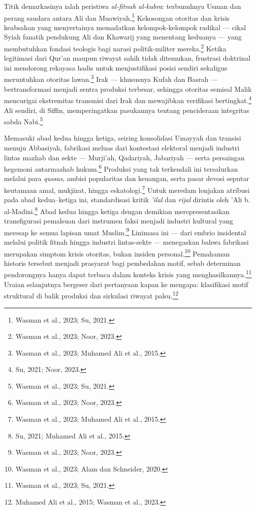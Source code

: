 Titik demarkasinya ialah peristiwa \textit{al-fitnah al-kubra}: terbunuhnya Usman dan perang saudara antara Ali dan Muawiyah.\footnote{Wasman et al., 2023; Su, 2021.} Kekosongan otoritas dan krisis keabsahan yang menyertainya memadatkan kelompok-kelompok radikal --- cikal Syiah fanatik pendukung Ali dan Khawarij yang menentang keduanya --- yang membutuhkan fondasi teologis bagi narasi politik-militer mereka.\footnote{Wasman et al., 2023; Noor, 2023.} Ketika legitimasi dari Qur'an maupun riwayat sahih tidak ditemukan, frustrasi doktrinal ini mendorong rekayasa hadis untuk menjustifikasi posisi sendiri sekaligus meruntuhkan otoritas lawan.\footnote{Wasman et al., 2023; Muhamed Ali et al., 2015.} Irak --- khususnya Kufah dan Basrah --- bertransformasi menjadi sentra produksi terbesar, sehingga otoritas semisal Malik mencurigai ekstremitas transmisi dari Irak dan mewajibkan verifikasi bertingkat.\footnote{Su, 2021; Noor, 2023.} Ali sendiri, di Siffin, memperingatkan pasukannya tentang pencideraan integritas sabda Nabi.\footnote{Wasman et al., 2023; Su, 2021.}

Memasuki abad kedua hingga ketiga, seiring konsolidasi Umayyah dan transisi menuju Abbasiyah, fabrikasi meluas dari kontestasi elektoral menjadi industri lintas mazhab dan sekte --- Murji'ah, Qadariyah, Jabariyah --- serta persaingan hegemoni antarmazhab hukum.\footnote{Wasman et al., 2023; Noor, 2023.} Produksi yang tak terkendali ini tersalurkan melalui para \textit{qussas}, ambisi popularitas dan keuangan, serta pasar devosi seputar keutamaan amal, mukjizat, hingga eskatologi.\footnote{Wasman et al., 2023; Muhamed Ali et al., 2015.} Untuk meredam lonjakan atribusi pada abad kedua--ketiga ini, standardisasi kritik \textit{'ilal} dan \textit{rijal} dirintis oleh 'Ali b. al-Madini.\footnote{Su, 2021; Muhamed Ali et al., 2015.} Abad kedua hingga ketiga dengan demikian merepresentasikan transfigurasi pemalsuan dari instrumen faksi menjadi industri kultural yang meresap ke semua lapisan umat Muslim.\footnote{Wasman et al., 2023; Noor, 2023.} Linimasa ini --- dari embrio insidental melalui politik fitnah hingga industri lintas-sekte --- menegaskan bahwa fabrikasi merupakan simptom krisis otoritas, bukan insiden personal.\footnote{Wasman et al., 2023; Alam dan Schneider, 2020.} Pemahaman historis tersebut menjadi prasyarat bagi pembedahan motif, sebab determinan pendorongnya hanya dapat terbaca dalam konteks krisis yang menghasilkannya.\footnote{Wasman et al., 2023; Su, 2021.} Uraian selanjutnya bergeser dari pertanyaan kapan ke mengapa: klasifikasi motif struktural di balik produksi dan sirkulasi riwayat palsu.\footnote{Muhamed Ali et al., 2015; Wasman et al., 2023.}

